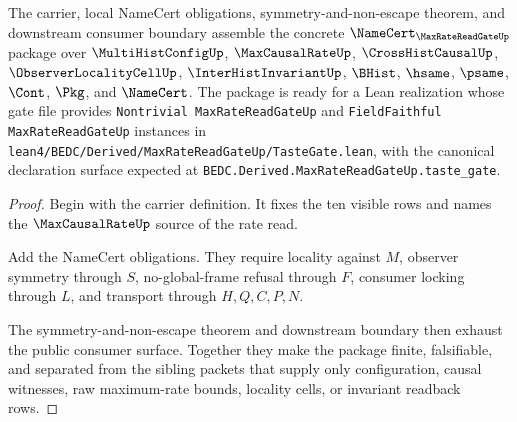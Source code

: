 \begin{theorem}
\label{thm:max-rate-read-gate-namecert-package}
The carrier, local NameCert obligations, symmetry-and-non-escape theorem, and downstream consumer boundary assemble the concrete $\NameCert_{\MaxRateReadGateUp}$ package over $\MultiHistConfigUp$, $\MaxCausalRateUp$, $\CrossHistCausalUp$, $\ObserverLocalityCellUp$, $\InterHistInvariantUp$, $\BHist$, $\hsame$, $\psame$, $\Cont$, $\Pkg$, and $\NameCert$. The package is ready for a Lean realization whose gate file provides \texttt{Nontrivial MaxRateReadGateUp} and \texttt{FieldFaithful MaxRateReadGateUp} instances in \texttt{lean4/BEDC/Derived/MaxRateReadGateUp/TasteGate.lean}, with the canonical declaration surface expected at \texttt{BEDC.Derived.MaxRateReadGateUp.taste\_gate}.
\end{theorem}
\begin{proof}
Begin with the carrier definition. It fixes the ten visible rows and names the $\MaxCausalRateUp$ source of the rate read.

Add the NameCert obligations. They require locality against $M$, observer symmetry through $S$, no-global-frame refusal through $F$, consumer locking through $L$, and transport through $H,Q,C,P,N$.

The symmetry-and-non-escape theorem and downstream boundary then exhaust the public consumer surface. Together they make the package finite, falsifiable, and separated from the sibling packets that supply only configuration, causal witnesses, raw maximum-rate bounds, locality cells, or invariant readback rows.
\end{proof}

